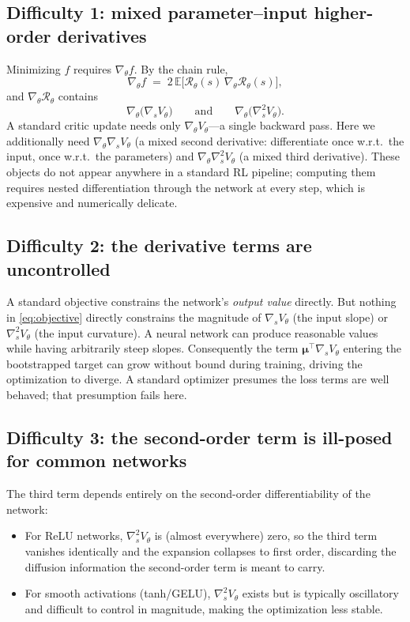 \documentclass[11pt]{article}
\newcommand{\E}{\mathbb{E}}
\newcommand{\grad}{\nabla}
\newcommand{\grads}{\nabla_s}
\newcommand{\hess}{\nabla_s^2}
\newcommand{\Res}{\mathcal{R}}
\begin{document}
\subsection*{Difficulty 1: mixed parameter--input higher-order derivatives}
Minimizing $f$ requires $\grad_\theta f$. By the chain rule,
\begin{equation}
\grad_\theta f \;=\; 2\,\E\big[\Res_\theta(s)\,\grad_\theta \Res_\theta(s)\big],
\end{equation}
and $\grad_\theta \Res_\theta$ contains
\begin{equation}
\grad_\theta\!\big(\grads V_\theta\big)
\qquad\text{and}\qquad
\grad_\theta\!\big(\hess V_\theta\big).
\end{equation}
A standard critic update needs only $\grad_\theta V_\theta$---a single
backward pass. Here we additionally need $\grad_\theta\grads V_\theta$ (a
mixed second derivative: differentiate once w.r.t.\ the input, once w.r.t.\
the parameters) and $\grad_\theta\hess V_\theta$ (a mixed third derivative).
These objects do not appear anywhere in a standard RL pipeline; computing
them requires nested differentiation through the network at every step,
which is expensive and numerically delicate.

\subsection*{Difficulty 2: the derivative terms are uncontrolled}
A standard objective constrains the network's \emph{output value} directly.
But nothing in \eqref{eq:objective} directly constrains the magnitude of
$\grads V_\theta$ (the input slope) or $\hess V_\theta$ (the input
curvature). A neural network can produce reasonable values while having
arbitrarily steep slopes. Consequently the term
$\bm{\mu}^\top \grads V_\theta$ entering the bootstrapped target can grow
without bound during training, driving the optimization to diverge.
A standard optimizer presumes the loss terms are well behaved; that
presumption fails here.

\subsection*{Difficulty 3: the second-order term is ill-posed for common networks}
The third term depends entirely on the second-order differentiability of
the network:
\begin{itemize}[leftmargin=1.5em]
\item For ReLU networks, $\hess V_\theta$ is (almost everywhere) zero, so
the third term vanishes identically and the expansion collapses to first
order, discarding the diffusion information the second-order term is meant
to carry.
\item For smooth activations (tanh/GELU), $\hess V_\theta$ exists but is
typically oscillatory and difficult to control in magnitude, making the
optimization less stable.
\end{itemize}
\end{document}
